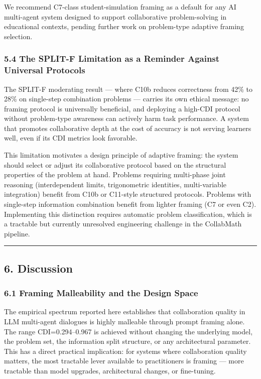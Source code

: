 \documentclass[
  11pt,
]{article}
\begin{document}
We recommend C7-class student-simulation framing as a default for any
AI multi-agent system designed to support collaborative problem-solving
in educational contexts, pending further work on problem-type adaptive
framing selection.

\subsubsection{5.4 The SPLIT-F Limitation as a Reminder Against Universal Protocols}\label{split-f-ethics}

The SPLIT-F moderating result --- where C10b reduces correctness from
42\% to 28\% on single-step combination problems --- carries its own
ethical message: no framing protocol is universally beneficial, and
deploying a high-CDI protocol without problem-type awareness can
actively harm task performance. A system that promotes collaborative
depth at the cost of accuracy is not serving learners well, even if its
CDI metrics look favorable.

This limitation motivates a design principle of adaptive framing: the
system should select or adjust its collaborative protocol based on the
structural properties of the problem at hand. Problems requiring
multi-phase joint reasoning (interdependent limits, trigonometric
identities, multi-variable integration) benefit from C10b or C11-style
structured protocols. Problems with single-step information combination
benefit from lighter framing (C7 or even C2). Implementing this
distinction requires automatic problem classification, which is a
tractable but currently unresolved engineering challenge in the
CollabMath pipeline.

\begin{center}\rule{0.5\linewidth}{0.5pt}\end{center}

\subsection{6. Discussion}\label{discussion}

\subsubsection{6.1 Framing Malleability and the Design Space}\label{framing-malleability}

The empirical spectrum reported here establishes that collaboration
quality in LLM multi-agent dialogues is highly malleable through prompt
framing alone. The range CDI=0.294--0.967 is achieved without changing
the underlying model, the problem set, the information split structure,
or any architectural parameter. This has a direct practical implication:
for systems where collaboration quality matters, the most tractable lever
available to practitioners is framing --- more tractable than model
upgrades, architectural changes, or fine-tuning.
\end{document}
